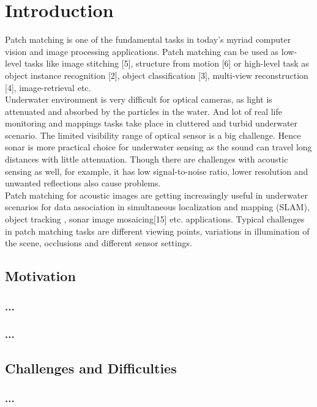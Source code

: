 
\chapter{Introduction}

Patch matching is one of the fundamental tasks in today’s myriad computer vision and image processing applications. 
Patch matching can be used as low-level tasks like image stitching [5], structure from motion [6] or high-level task as object instance recognition [2],
object classification [3], multi-view reconstruction [4], image-retrieval etc.\\
Underwater environment is very difficult for optical cameras, as light is attenuated and absorbed by the particles in the water. 
And lot of real life monitoring and mappings tasks take place in cluttered and turbid underwater scenario. 
The limited visibility range of optical sensor is a big challenge. Hence sonar is more practical choice for underwater sensing as the sound can travel 
long distances with little attenuation. Though there are challenges with acoustic sensing as well, for example, it has low signal-to-noise ratio, lower 
resolution and unwanted reflections also cause problems.\\
Patch matching for acoustic images are getting increasingly useful in underwater scenarios for data association in simultaneous localization and mapping (SLAM),
object tracking , sonar image mosaicing[15] etc. applications. Typical challenges in patch matching tasks are different viewing points, 
variations in illumination of the scene, occlusions and different sensor settings.
\section{Motivation}
\subsection{...}

\lipsum[1-5]

\subsection{...}


\section{Challenges and Difficulties}
\subsection{...}

